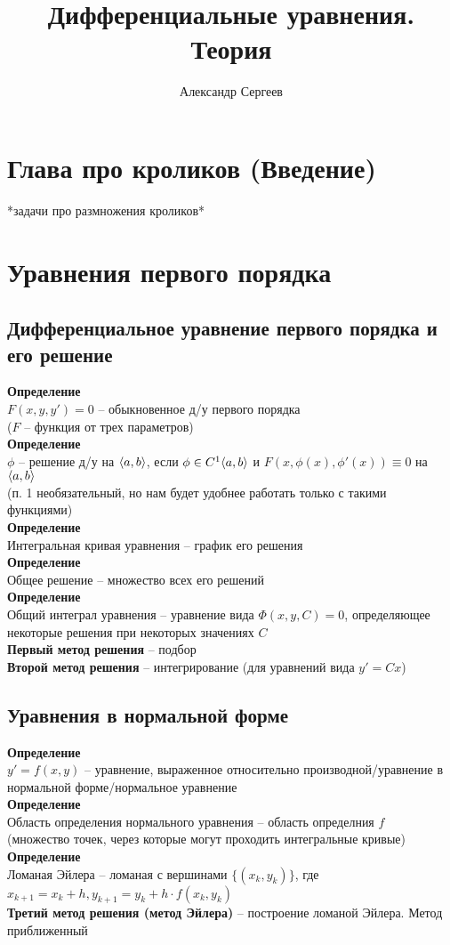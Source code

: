 \documentclass[12pt]{article}
\title{Дифференциальные уравнения. Теория}
\author{Александр Сергеев}
\date{}
\begin{document}
\maketitle
\section{Глава про кроликов (Введение)}
*задачи про размножения кроликов*
\section{Уравнения первого порядка}
\subsection{Дифференциальное уравнение первого порядка и его решение}
\textbf{Определение}\\
$F(x, y, y') = 0$ -- обыкновенное д/у первого порядка\\
($F$ -- функция от трех параметров)\\
\textbf{Определение}\\
$\phi$ -- решение д/у на $\langle a, b \rangle$, если $\phi \in C^1\langle a, b \rangle$ и $F(x, \phi(x), \phi'(x)) \equiv 0$ на $\langle a, b \rangle$\\
(п. 1 необязательный, но нам будет удобнее работать только с такими функциями)\\
\textbf{Определение}\\
Интегральная кривая уравнения -- график его решения\\
\textbf{Определение}\\
Общее решение -- множество всех его решений\\
\textbf{Определение}\\
Общий интеграл уравнения -- уравнение вида $\Phi(x, y, C) = 0$, определяющее некоторые решения при некоторых значениях $C$\\
\textbf{Первый метод решения} -- подбор\\
\textbf{Второй метод решения} -- интегрирование (для уравнений вида $y'=Cx$)
\subsection{Уравнения в нормальной форме}
\textbf{Определение}\\
$y' = f(x, y)$ -- уравнение, выраженное относительно производной/уравнение в нормальной форме/нормальное уравнение\\
\textbf{Определение}\\
Область определения нормального уравнения -- область определния $f$\\
(множество точек, через которые могут проходить интегральные кривые)\\
\textbf{Определение}\\
Ломаная Эйлера -- ломаная с вершинами $\{(x_k, y_k)\}$, где $x_{k+1} = x_k + h, y_{k+1}=y_k+h\cdot f(x_k, y_k)$\\
\textbf{Третий метод решения (метод Эйлера)} -- построение ломаной Эйлера. Метод приближенный
\end{document}
